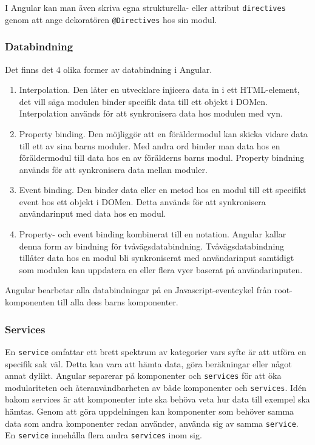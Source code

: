 I Angular kan man även skriva egna strukturella- eller attribut \texttt{directives} genom att ange dekoratören \texttt{@Directives} hos sin modul. \cite{angular-components}


\subsubsection{Databindning}
\label{angular-data-binding}
Det finns det 4 olika former av databindning i Angular. \cite{angular-components} 
\begin{enumerate}
    \item Interpolation. Den låter en utvecklare injicera data in i ett HTML-element, det vill säga modulen binder specifik data till ett objekt i DOMen. Interpolation används för att synkronisera data hos modulen med vyn.
    
    \item Property binding. Den möjliggör att en föräldermodul kan skicka vidare data till ett av sina barns moduler. Med andra ord binder man data hos en föräldermodul till data hos en av förälderns barns modul. Property bindning används för att synkronisera data mellan moduler. \cite{angular-databinding}

    \item Event binding. Den binder data eller en metod hos en modul till ett specifikt event hos ett objekt i DOMen. Detta används för att synkronisera användarinput med data hos en modul.

    \item Property- och event binding kombinerat till en notation. Angular kallar denna form av bindning för tvåvägsdatabindning. Tvåvägsdatabindning tillåter data hos en modul bli synkroniserat med användarinput samtidigt som modulen kan uppdatera en eller flera vyer baserat på användarinputen.

\end{enumerate}

Angular bearbetar alla databindningar på en Javascript-eventcykel från root-komponenten till alla dess barns komponenter. \cite{angular-components}


\subsubsection{Services}
\label{angular-services}
En \texttt{service} omfattar ett brett spektrum av kategorier vars syfte är att utföra en specifik sak väl. Detta kan vara att hämta data, göra beräkningar eller något annat dylikt. Angular separerar på komponenter och \texttt{services} för att öka modulariteten och återanvändbarheten av både komponenter och \texttt{services}. Idén bakom services är att komponenter inte ska behöva veta hur data till exempel ska hämtas. Genom att göra uppdelningen kan komponenter som behöver samma data som andra komponenter redan använder, använda sig av samma \texttt{service}. \cite{angular-services} En \texttt{service} innehålla flera andra \texttt{services} inom sig.

